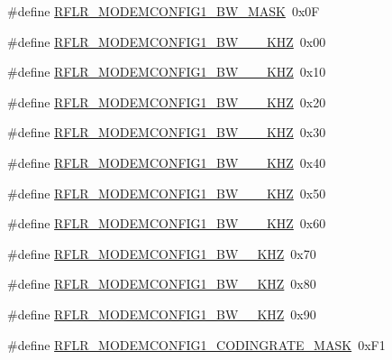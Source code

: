 \begin{DoxyCompactItemize}
\#define \mbox{\hyperlink{sx1276_regs-_lo_ra_8h_ab1aa24187e882f0f54896b50ccae77d4}{R\+F\+L\+R\+\_\+\+M\+O\+D\+E\+M\+C\+O\+N\+F\+I\+G1\+\_\+\+B\+W\+\_\+\+M\+A\+SK}}~0x0F
\item 
\#define \mbox{\hyperlink{sx1276_regs-_lo_ra_8h_a5588d7dec546c6f6f676ab4f7574604a}{R\+F\+L\+R\+\_\+\+M\+O\+D\+E\+M\+C\+O\+N\+F\+I\+G1\+\_\+\+B\+W\+\_\+\_\+\_\+\+K\+HZ}}~0x00
\item 
\#define \mbox{\hyperlink{sx1276_regs-_lo_ra_8h_acc64eb6597ce1a53b3150ed0e66ed5c1}{R\+F\+L\+R\+\_\+\+M\+O\+D\+E\+M\+C\+O\+N\+F\+I\+G1\+\_\+\+B\+W\+\_\+\_\+\_\+\+K\+HZ}}~0x10
\item 
\#define \mbox{\hyperlink{sx1276_regs-_lo_ra_8h_a302f1d2a8b4689aeb3f09e49d882d953}{R\+F\+L\+R\+\_\+\+M\+O\+D\+E\+M\+C\+O\+N\+F\+I\+G1\+\_\+\+B\+W\+\_\+\_\+\_\+\+K\+HZ}}~0x20
\item 
\#define \mbox{\hyperlink{sx1276_regs-_lo_ra_8h_a12c825dc67bb4487e8c3844336dfbef0}{R\+F\+L\+R\+\_\+\+M\+O\+D\+E\+M\+C\+O\+N\+F\+I\+G1\+\_\+\+B\+W\+\_\+\_\+\_\+\+K\+HZ}}~0x30
\item 
\#define \mbox{\hyperlink{sx1276_regs-_lo_ra_8h_ac09be492d1d58049e2c5cef4e99607cf}{R\+F\+L\+R\+\_\+\+M\+O\+D\+E\+M\+C\+O\+N\+F\+I\+G1\+\_\+\+B\+W\+\_\+\_\+\_\+\+K\+HZ}}~0x40
\item 
\#define \mbox{\hyperlink{sx1276_regs-_lo_ra_8h_a06e169f2f77974e5f6744d3207878895}{R\+F\+L\+R\+\_\+\+M\+O\+D\+E\+M\+C\+O\+N\+F\+I\+G1\+\_\+\+B\+W\+\_\+\_\+\_\+\+K\+HZ}}~0x50
\item 
\#define \mbox{\hyperlink{sx1276_regs-_lo_ra_8h_a6fa8fd52b3b97c984c917da3ce089bf4}{R\+F\+L\+R\+\_\+\+M\+O\+D\+E\+M\+C\+O\+N\+F\+I\+G1\+\_\+\+B\+W\+\_\+\_\+\_\+\+K\+HZ}}~0x60
\item 
\#define \mbox{\hyperlink{sx1276_regs-_lo_ra_8h_aa19a521faa54c9c8ced4d57973434b1b}{R\+F\+L\+R\+\_\+\+M\+O\+D\+E\+M\+C\+O\+N\+F\+I\+G1\+\_\+\+B\+W\+\_\+\_\+\+K\+HZ}}~0x70
\item 
\#define \mbox{\hyperlink{sx1276_regs-_lo_ra_8h_ab0f85fb037803d4312f614171ceebb45}{R\+F\+L\+R\+\_\+\+M\+O\+D\+E\+M\+C\+O\+N\+F\+I\+G1\+\_\+\+B\+W\+\_\+\_\+\+K\+HZ}}~0x80
\item 
\#define \mbox{\hyperlink{sx1276_regs-_lo_ra_8h_a9fbb21591b341afa0fce0263570d5a03}{R\+F\+L\+R\+\_\+\+M\+O\+D\+E\+M\+C\+O\+N\+F\+I\+G1\+\_\+\+B\+W\+\_\+\_\+\+K\+HZ}}~0x90
\item 
\#define \mbox{\hyperlink{sx1276_regs-_lo_ra_8h_aeb0ea5fbbb7ec90fca31ca87481597c1}{R\+F\+L\+R\+\_\+\+M\+O\+D\+E\+M\+C\+O\+N\+F\+I\+G1\+\_\+\+C\+O\+D\+I\+N\+G\+R\+A\+T\+E\+\_\+\+M\+A\+SK}}~0x\+F1

\end{DoxyCompactItemize}
